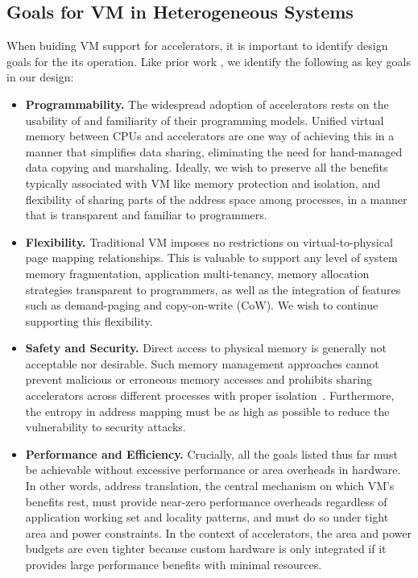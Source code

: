 \subsection{Goals for VM in Heterogeneous Systems}
When buiding VM support for accelerators, it is important to identify
design goals for the its operation. Like prior work
\cite{haria:devirtualizing}, we identify the following as key goals in
our design:

\begin{itemize}
        \item \textbf{Programmability.} The widespread adoption of
          accelerators rests on the usability of and familiarity of
          their programming models. Unified virtual memory between
          CPUs and accelerators are one way of achieving this in a
          manner that simplifies data sharing, eliminating the need
          for hand-managed data copying and marshaling. Ideally, we
          wish to preserve all the benefits typically associated with
          VM like memory protection and isolation, and flexibility of
          sharing parts of the address space among processes, in a
          manner that is transparent and familiar to programmers.

        \item \textbf{Flexibility.} Traditional VM imposes no
          restrictions on virtual-to-physical page mapping
          relationships. This is valuable to support any level of
          system memory fragmentation, application multi-tenancy,
          memory allocation strategies transparent to programmers, as
          well as the integration of features such as demand-paging
          and copy-on-write (CoW). We wish to continue supporting this
          flexibility.

        \item \textbf{Safety and Security.} Direct access to physical
          memory is generally not acceptable nor desirable. Such
          memory management approaches cannot prevent malicious or
          erroneous memory accesses and prohibits sharing accelerators
          across different processes with proper
          isolation~\cite{haria:devirtualizing}. Furthermore, the
          entropy in address mapping must be as high as possible to
          reduce the vulnerability to security attacks.

        \item \textbf{Performance and Efficiency.} Crucially, all the
          goals listed thus far must be achievable without excessive
          performance or area overheads in hardware. In other words,
          address translation, the central mechanism on which VM's
          benefits rest, must provide near-zero performance overheads
          regardless of application working set and locality patterns,
          and must do so under tight area and power constraints. In
          the context of accelerators, the area and power budgets are
          even tighter because custom hardware is only integrated if
          it provides large performance benefits with minimal
          resources.


\end{itemize}


